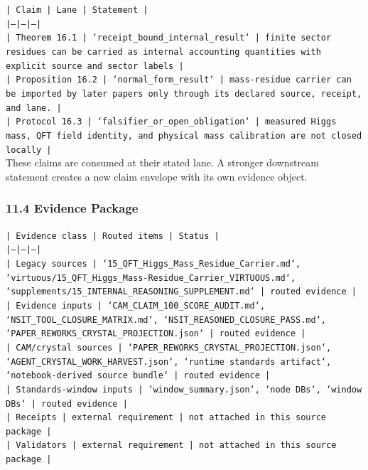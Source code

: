 \documentclass[11pt]{article}
\begin{document}
\noindent\texttt{| Claim | Lane | Statement |}\\
\noindent\texttt{|---|---|---|}\\
\noindent\texttt{| Theorem 16.1 | `receipt\_bound\_internal\_result` | finite sector residues can be carried as internal accounting quantities with explicit source and sector labels |}\\
\noindent\texttt{| Proposition 16.2 | `normal\_form\_result` | mass-residue carrier can be imported by later papers only through its declared source, receipt, and lane. |}\\
\noindent\texttt{| Protocol 16.3 | `falsifier\_or\_open\_obligation` | measured Higgs mass, QFT field identity, and physical mass calibration are not closed locally |}\\

These claims are consumed at their stated lane. A stronger downstream statement
creates a new claim envelope with its own evidence object.

\subsubsection*{11.4 Evidence Package}

\noindent\texttt{| Evidence class | Routed items | Status |}\\
\noindent\texttt{|---|---|---|}\\
\noindent\texttt{| Legacy sources | `15\_QFT\_Higgs\_Mass\_Residue\_Carrier.md`, `virtuous/15\_QFT\_Higgs\_Mass-Residue\_Carrier\_VIRTUOUS.md`, `supplements/15\_INTERNAL\_REASONING\_SUPPLEMENT.md` | routed evidence |}\\
\noindent\texttt{| Evidence inputs | `CAM\_CLAIM\_100\_SCORE\_AUDIT.md`, `NSIT\_TOOL\_CLOSURE\_MATRIX.md`, `NSIT\_REASONED\_CLOSURE\_PASS.md`, `PAPER\_REWORKS\_CRYSTAL\_PROJECTION.json` | routed evidence |}\\
\noindent\texttt{| CAM/crystal sources | `PAPER\_REWORKS\_CRYSTAL\_PROJECTION.json`, `AGENT\_CRYSTAL\_WORK\_HARVEST.json`, `runtime standards artifact`, `notebook-derived source bundle` | routed evidence |}\\
\noindent\texttt{| Standards-window inputs | `window\_summary.json`, `node DBs`, `window DBs` | routed evidence |}\\
\noindent\texttt{| Receipts | external requirement | not attached in this source package |}\\
\noindent\texttt{| Validators | external requirement | not attached in this source package |}\\
\end{document}
